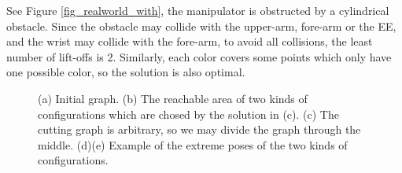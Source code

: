 \documentclass[journal]{IEEEtran}
\begin{document}
See Figure \ref{fig_realworld_with}, the manipulator is obstructed by a cylindrical obstacle. Since the obstacle may collide with the upper-arm, fore-arm or the EE, and the wrist may collide with the fore-arm, to avoid all collisions, the least number of lift-offs is 2. Similarly, each color covers some points which only have one possible color, so the solution is also optimal. 

\begin{figure}[t]
\centering
{}
\caption{(a) Initial graph. (b) The reachable area of two kinds of configurations which are chosed by the solution in (c). (c) The cutting graph is arbitrary, so we may divide the graph through the middle. (d)(e) Example of the extreme poses of the two kinds of configurations. }\label{fig_realworld_no}
\end{figure}
\end{document}

